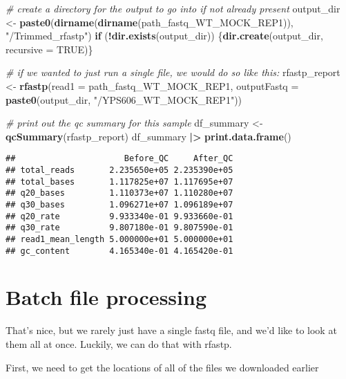 \documentclass[
]{book}
\newenvironment{Shaded}{\begin{snugshade}}{\end{snugshade}}
\newcommand{\AttributeTok}[1]{\textcolor[rgb]{0.13,0.29,0.53}{#1}}
\newcommand{\CommentTok}[1]{\textcolor[rgb]{0.56,0.35,0.01}{\textit{#1}}}
\newcommand{\ConstantTok}[1]{\textcolor[rgb]{0.56,0.35,0.01}{#1}}
\newcommand{\ControlFlowTok}[1]{\textcolor[rgb]{0.13,0.29,0.53}{\textbf{#1}}}
\newcommand{\FunctionTok}[1]{\textcolor[rgb]{0.13,0.29,0.53}{\textbf{#1}}}
\newcommand{\NormalTok}[1]{#1}
\newcommand{\OtherTok}[1]{\textcolor[rgb]{0.56,0.35,0.01}{#1}}
\newcommand{\SpecialCharTok}[1]{\textcolor[rgb]{0.81,0.36,0.00}{\textbf{#1}}}
\newcommand{\StringTok}[1]{\textcolor[rgb]{0.31,0.60,0.02}{#1}}
\begin{document}
\begin{Shaded}
\begin{Highlighting}[]
\CommentTok{\# create a directory for the output to go into if not already present}
\NormalTok{output\_dir }\OtherTok{\textless{}{-}} \FunctionTok{paste0}\NormalTok{(}\FunctionTok{dirname}\NormalTok{(}\FunctionTok{dirname}\NormalTok{(path\_fastq\_WT\_MOCK\_REP1)), }\StringTok{"/Trimmed\_rfastp"}\NormalTok{) }
\ControlFlowTok{if}\NormalTok{ (}\SpecialCharTok{!}\FunctionTok{dir.exists}\NormalTok{(output\_dir)) \{}\FunctionTok{dir.create}\NormalTok{(output\_dir, }\AttributeTok{recursive =} \ConstantTok{TRUE}\NormalTok{)\}}

\CommentTok{\# if we wanted to just run a single file, we would do so like this:}
\NormalTok{rfastp\_report }\OtherTok{\textless{}{-}} \FunctionTok{rfastp}\NormalTok{(}\AttributeTok{read1 =}\NormalTok{ path\_fastq\_WT\_MOCK\_REP1,}
                        \AttributeTok{outputFastq =} \FunctionTok{paste0}\NormalTok{(output\_dir, }\StringTok{"/YPS606\_WT\_MOCK\_REP1"}\NormalTok{))}

\CommentTok{\# print out the qc summary for this sample}
\NormalTok{df\_summary }\OtherTok{\textless{}{-}} \FunctionTok{qcSummary}\NormalTok{(rfastp\_report)}
\NormalTok{df\_summary }\SpecialCharTok{|\textgreater{}} \FunctionTok{print.data.frame}\NormalTok{()}
\end{Highlighting}
\end{Shaded}

\begin{verbatim}
##                      Before_QC     After_QC
## total_reads       2.235650e+05 2.235390e+05
## total_bases       1.117825e+07 1.117695e+07
## q20_bases         1.110373e+07 1.110280e+07
## q30_bases         1.096271e+07 1.096189e+07
## q20_rate          9.933340e-01 9.933660e-01
## q30_rate          9.807180e-01 9.807590e-01
## read1_mean_length 5.000000e+01 5.000000e+01
## gc_content        4.165340e-01 4.165420e-01
\end{verbatim}

\hypertarget{batch-file-processing}{%
\section{Batch file processing}\label{batch-file-processing}}

That's nice, but we rarely just have a single fastq file, and we'd like to look at them all at once. Luckily, we can do that with rfastp.

First, we need to get the locations of all of the files we downloaded earlier
\end{document}
